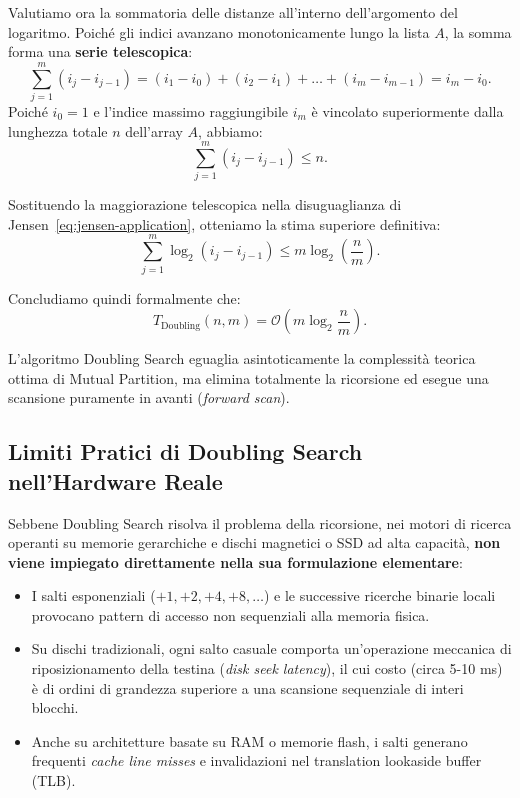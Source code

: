 Valutiamo ora la sommatoria delle distanze all'interno dell'argomento del logaritmo. Poiché gli indici avanzano monotonicamente lungo la lista $A$, la somma forma una \textbf{serie telescopica}:
\begin{equation}
  \sum_{j=1}^m (i_j - i_{j-1}) = (i_1 - i_0) + (i_2 - i_1) + \dots + (i_m - i_{m-1}) = i_m - i_0.
\end{equation}
Poiché $i_0 = 1$ e l'indice massimo raggiungibile $i_m$ è vincolato superiormente dalla lunghezza totale $n$ dell'array $A$, abbiamo:
\begin{equation}
  \sum_{j=1}^m (i_j - i_{j-1}) \le n.
\end{equation}

Sostituendo la maggiorazione telescopica nella disuguaglianza di Jensen~\eqref{eq:jensen-application}, otteniamo la stima superiore definitiva:
\begin{equation}
  \sum_{j=1}^m \log_2(i_j - i_{j-1}) \le m \log_2\left(\frac{n}{m}\right).
\end{equation}

Concludiamo quindi formalmente che:
\begin{equation}
  T_{\text{Doubling}}(n, m) = \mathcal{O}\left(m \log_2 \frac{n}{m}\right).
\end{equation}

L'algoritmo Doubling Search eguaglia asintoticamente la complessità teorica ottima di Mutual Partition, ma elimina totalmente la ricorsione ed esegue una scansione puramente in avanti (\textit{forward scan}).

\subsection{Limiti Pratici di Doubling Search nell'Hardware Reale}
Sebbene Doubling Search risolva il problema della ricorsione, nei motori di ricerca operanti su memorie gerarchiche e dischi magnetici o SSD ad alta capacità, \textbf{non viene impiegato direttamente nella sua formulazione elementare}:
\begin{itemize}
  \item I salti esponenziali ($+1, +2, +4, +8, \dots$) e le successive ricerche binarie locali provocano pattern di accesso non sequenziali alla memoria fisica.
  \item Su dischi tradizionali, ogni salto casuale comporta un'operazione meccanica di riposizionamento della testina (\textit{disk seek latency}), il cui costo (circa 5-10 ms) è di ordini di grandezza superiore a una scansione sequenziale di interi blocchi.
  \item Anche su architetture basate su RAM o memorie flash, i salti generano frequenti \textit{cache line misses} e invalidazioni nel translation lookaside buffer (TLB).
\end{itemize}

